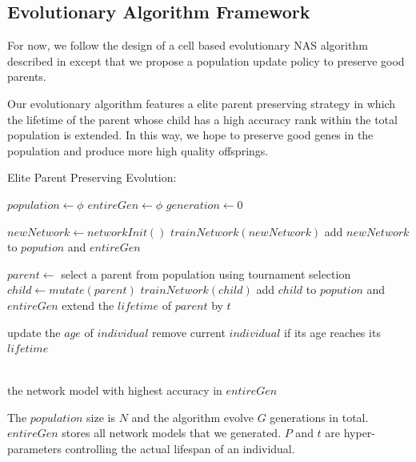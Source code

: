 \documentclass[conference]{IEEEtran}
\begin{document}
  \subsection{Evolutionary Algorithm Framework}
  For now, we follow the design of a cell based evolutionary NAS algorithm described in\cite{DBLP:journals/corr/abs-1802-01548} except that we propose a population update policy to preserve good parents. 

  Our evolutionary algorithm features a elite parent preserving strategy in which the lifetime of the parent whose child has a high accuracy rank within the total population is extended. In this way, we hope to preserve good genes in the population and produce more high quality offsprings.

  \begin{algorithm}[H]  
    \caption{ Elite Parent Preserving Evolution:}
    \begin{algorithmic}[1]  
  
    \State $population\gets \phi$
    \State $entireGen\gets \phi$
    \State $generation\gets 0$
    
    \State $newNetwork\gets networkInit()$
    \State $trainNetwork(newNetwork)$
    \State add $newNetwork$ to $popution$ and $entireGen$
    \EndWhile
    
  
    
      \State $parent\gets$ select a parent from population using tournament selection 
      \State $child \gets mutate(parent)$
      \State $trainNetwork(child)$
      \State add $child$ to $popution$ and $entireGen$
        \State extend the $lifetime$ of $parent$ by $t$
      \EndIf
      
        \State update the $age$ of $individual$
        \State remove current $individual$ if its age reaches its $lifetime$
      \EndFor
      
      
    \EndWhile
    
    
    \\  
    \Return the network model with highest accuracy in $entireGen$
 
  \end{algorithmic}  
  \end{algorithm}  

The $population$ size is $N$ and the algorithm evolve $G$ generations in total. $entireGen$ stores all network models that we generated. $P$ and $t$ are hyper-parameters controlling the actual lifespan of an individual.
     
\end{document}
